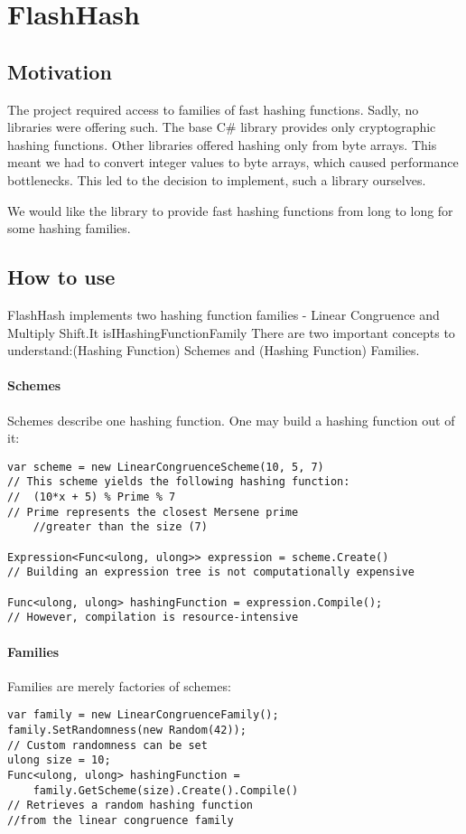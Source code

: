 \chapter{FlashHash}
\section{Motivation}
The project required access to families of fast hashing functions. Sadly, no libraries were offering such. The base C\# library provides only cryptographic hashing functions. Other libraries offered hashing only from byte arrays. This meant we had to convert integer values to byte arrays, which caused performance bottlenecks. This led to the decision to implement, such a library ourselves.

We would like the library to provide fast hashing functions from long to long for some hashing families.

\section{How to use}
FlashHash implements two hashing function families - Linear Congruence and Multiply Shift.It isIHashingFunctionFamily
There are two important concepts to understand:(Hashing Function) Schemes and (Hashing Function) Families. 
\subsubsection{Schemes}
Schemes describe one hashing function. One may build a hashing function out of it:
\begin{lstlisting}
var scheme = new LinearCongruenceScheme(10, 5, 7)
// This scheme yields the following hashing function:
//  (10*x + 5) % Prime % 7
// Prime represents the closest Mersene prime 
	//greater than the size (7)

Expression<Func<ulong, ulong>> expression = scheme.Create()
// Building an expression tree is not computationally expensive

Func<ulong, ulong> hashingFunction = expression.Compile();
// However, compilation is resource-intensive
\end{lstlisting}

\subsubsection{Families}
Families are merely factories of schemes:
\begin{lstlisting}
var family = new LinearCongruenceFamily();
family.SetRandomness(new Random(42));
// Custom randomness can be set
ulong size = 10;
Func<ulong, ulong> hashingFunction = 
    family.GetScheme(size).Create().Compile()
// Retrieves a random hashing function 
//from the linear congruence family
\end{lstlisting}




